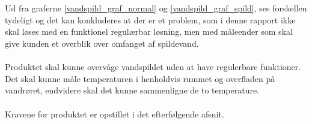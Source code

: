 \\
\\
Ud fra graferne \ref{vandspild_graf_normal} og \ref{vandspild_graf_spild}, ses forskellen tydeligt og det kan konkluderes at der er et problem, som i denne rapport ikke skal løses med en funktionel regulærbar løsning, men med måleender som skal give kunden et overblik over omfanget af spildevand.
\\
\\
Produktet skal kunne overvåge vandspildet uden at have regulerbare funktioner. Det skal kunne måle temperaturen i henholdvis rummet og overfladen på vandrøret, endvidere skal det kunne sammenligne de to temperature.
\\
\\
Kravene for produktet er opstillet i det efterfølgende afsnit.     